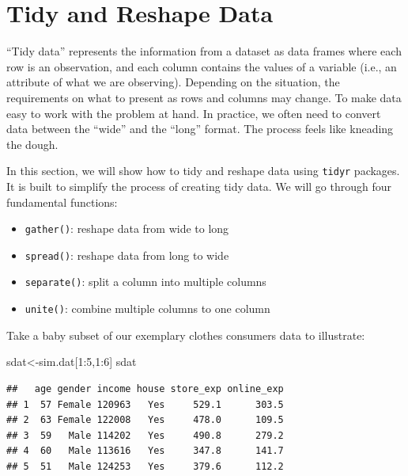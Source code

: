 \documentclass[
  12pt,
]{krantz}
\makeatletter
\newenvironment{Shaded}{\begin{snugshade}}{\end{snugshade}}
\newcommand{\DecValTok}[1]{\textcolor[rgb]{0.06,0.06,0.06}{#1}}
\newcommand{\NormalTok}[1]{#1}
\newcommand{\OtherTok}[1]{\textcolor[rgb]{0.37,0.37,0.37}{#1}}
\newcommand{\SpecialCharTok}[1]{\textcolor[rgb]{0,0,0}{#1}}
\providecommand{\tightlist}{%
  \setlength{\itemsep}{0pt}\setlength{\parskip}{0pt}}
\newenvironment{kframe}{%
\medskip{}
\setlength{\fboxsep}{.8em}
 \def\at@end@of@kframe{}%
 \ifinner\ifhmode%
  \def\at@end@of@kframe{\end{minipage}}%
  \begin{minipage}{\columnwidth}%
 \fi\fi%
 \def\FrameCommand##1{\hskip\@totalleftmargin \hskip-\fboxsep
 \colorbox{shadecolor}{##1}\hskip-\fboxsep
     \hskip-\linewidth \hskip-\@totalleftmargin \hskip\columnwidth}%
 \MakeFramed {\advance\hsize-\width
   \@totalleftmargin\z@ \linewidth\hsize
   \@setminipage}}%
 {\par\unskip\endMakeFramed%
 \at@end@of@kframe}
\renewenvironment{Shaded}{\begin{kframe}}{\end{kframe}}
\makeatother
\begin{document}
\hypertarget{tidy-and-reshape-data}{%
\section{Tidy and Reshape Data}\label{tidy-and-reshape-data}}

``Tidy data'' represents the information from a dataset as data frames where each row is an observation, and each column contains the values of a variable (i.e., an attribute of what we are observing). Depending on the situation, the requirements on what to present as rows and columns may change. To make data easy to work with the problem at hand. In practice, we often need to convert data between the ``wide'' and the ``long'' format. The process feels like kneading the dough.

In this section, we will show how to tidy and reshape data using \texttt{tidyr} packages. It is built to simplify the process of creating tidy data. We will go through four fundamental functions:

\begin{itemize}
\tightlist
\item
  \texttt{gather()}: reshape data from wide to long
\item
  \texttt{spread()}: reshape data from long to wide
\item
  \texttt{separate()}: split a column into multiple columns
\item
  \texttt{unite()}: combine multiple columns to one column
\end{itemize}

Take a baby subset of our exemplary clothes consumers data to illustrate:

\begin{Shaded}
\begin{Highlighting}[]
\NormalTok{sdat}\OtherTok{\textless{}{-}}\NormalTok{sim.dat[}\DecValTok{1}\SpecialCharTok{:}\DecValTok{5}\NormalTok{,}\DecValTok{1}\SpecialCharTok{:}\DecValTok{6}\NormalTok{]}
\NormalTok{sdat}
\end{Highlighting}
\end{Shaded}

\begin{verbatim}
##   age gender income house store_exp online_exp
## 1  57 Female 120963   Yes     529.1      303.5
## 2  63 Female 122008   Yes     478.0      109.5
## 3  59   Male 114202   Yes     490.8      279.2
## 4  60   Male 113616   Yes     347.8      141.7
## 5  51   Male 124253   Yes     379.6      112.2
\end{verbatim}
\end{document}
